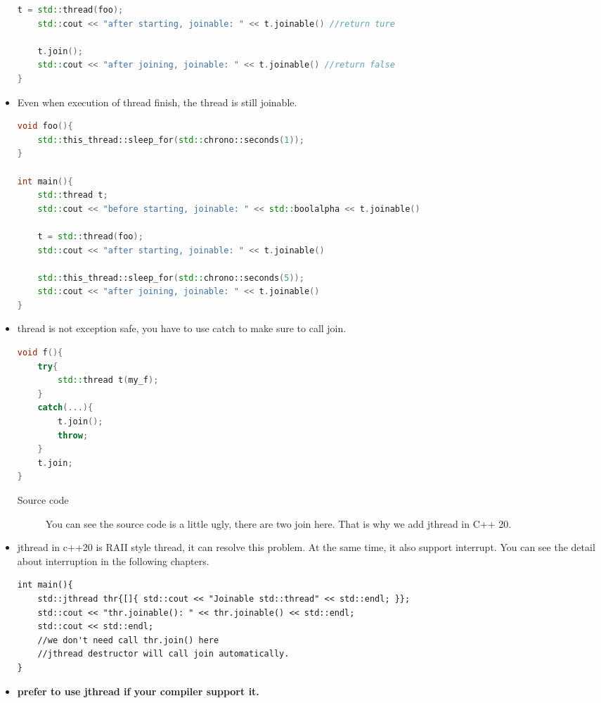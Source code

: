 \documentclass[a4paper,11pt,twoside]{book}
\begin{document}
\begin{itemize}
\begin{lstlisting}[frame=single, language=c++]
	t = std::thread(foo);
	std::cout << "after starting, joinable: " << t.joinable() //return ture 
	
	t.join();
	std::cout << "after joining, joinable: " << t.joinable() //return false
}
\end{lstlisting}


\item Even when execution of thread finish, the thread is still joinable.  

\begin{lstlisting}[frame=single, language=c++]
void foo(){
	std::this_thread::sleep_for(std::chrono::seconds(1));
}

int main(){
	std::thread t;
	std::cout << "before starting, joinable: " << std::boolalpha << t.joinable()
	
	t = std::thread(foo);
	std::cout << "after starting, joinable: " << t.joinable() 
	
	std::this_thread::sleep_for(std::chrono::seconds(5));
	std::cout << "after joining, joinable: " << t.joinable() 
}
\end{lstlisting}

\item thread is not exception safe, you have to use catch to make sure to call join.

\begin{lstlisting}[frame=single, language=c++]
void f(){
	try{
		std::thread t(my_f);
	}
	catch(...){
		t.join();
		throw;
	}
	t.join;
}
\end{lstlisting}

\begin{description}
	\item[Source code] You can see the source code is a little ugly, there are two join here. That is why we add jthread in C++ 20.
\end{description}

\item jthread in c++20 is RAII style thread, it can resolve this problem. At the same time, it also support interrupt. You can see the detail about interruption in the following chapters. 
\begin{lstlisting}
int main(){
    std::jthread thr{[]{ std::cout << "Joinable std::thread" << std::endl; }};
    std::cout << "thr.joinable(): " << thr.joinable() << std::endl;
    std::cout << std::endl;
	//we don't need call thr.join() here
	//jthread destructor will call join automatically.
}
\end{lstlisting}

\item \textbf{prefer to use jthread if your compiler support it.} 

\end{itemize}
\end{document}
